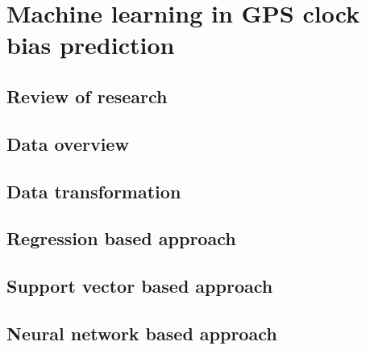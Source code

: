 \chapter{Machine learning in GPS clock bias prediction}


\section{Review of research}

\section{Data overview}

\section{Data transformation}

\section{Regression based approach}

\section{Support vector based approach}

\section{Neural network based approach}


